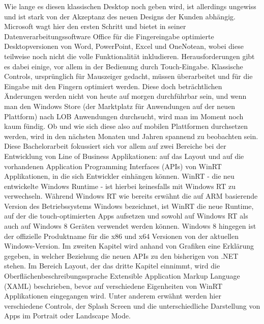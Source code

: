 \documentclass[a4paper,bibtotoc,oneside]{scrbook}
\begin{document}
Wie lange es diesen klassischen Desktop noch geben wird, ist allerdings ungewiss und ist stark von der Akzeptanz des neuen Designs der Kunden abhängig. Microsoft wagt hier den ersten Schritt und bietet in seiner Datenverarbeitungssoftware Office \glqq für die Fingereingabe optimierte Desktopversionen von Word, PowerPoint, Excel und OneNote\grqq an, wobei diese teilweise noch nicht die volle Funktionalität inkludieren.
\cite{winrt}
\newline
\newline
Herausforderungen gibt es dabei einige, vor allem in der Bedienung durch Touch-Eingabe. Klassische Controls, ursprünglich für Mauszeiger gedacht, müssen überarbeitet und für die Eingabe mit den Fingern optimiert werden. Diese doch beträchtlichen Änderungen werden nicht von heute auf morgen durchführbar sein, und wenn man den Windows Store (der Marktplatz für Anwendungen auf der neuen Plattform) nach LOB Anwendungen durchsucht, wird man im Moment noch kaum fündig.
\newline
Ob und wie sich diese also auf mobilen Plattformen durchsetzen werden, wird in den nächsten Monaten und Jahren spannend zu beobachten sein.
\newline
\newline
Diese Bachelorarbeit fokussiert sich vor allem auf zwei Bereiche bei der Entwicklung von Line of Business Applikationen: auf das Layout und auf die vorhandenen Application Programming Interfaces (APIs) von WinRT Applikationen, in die sich Entwickler einhängen können.
\newline
\newline
WinRT - die neu entwickelte Windows Runtime - ist hierbei keinesfalls mit Windows RT zu verwechseln. Während Windows RT wie bereits erwähnt die auf ARM basierende Version des Betriebssystems Windows bezeichnet, ist WinRT die neue Runtime, auf der die touch-optimierten Apps aufsetzen und sowohl auf Windows RT als auch auf Windows 8 Geräten verwendet werden können. Windows 8 hingegen ist der offizielle Produktname für die x86 und x64 Versionen von der aktuellen Windows-Version. Im zweiten Kapitel wird anhand von Grafiken eine Erklärung gegeben, in welcher Beziehung die neuen APIs zu den bisherigen von .NET stehen. \cite{winBlog12}
\newline
\newline
Im Bereich Layout, der das dritte Kapitel einnimmt, wird  die Oberflächenbeschreibungssprache Extensible Application Markup Language (XAML) beschrieben, bevor auf verschiedene Eigenheiten von WinRT Applikationen eingegangen wird. Unter anderem erwähnt werden hier verschiedene Controls, der Splash Screen und die unterschiedliche Darstellung von Apps im Portrait oder Landscape Mode.
\end{document}
